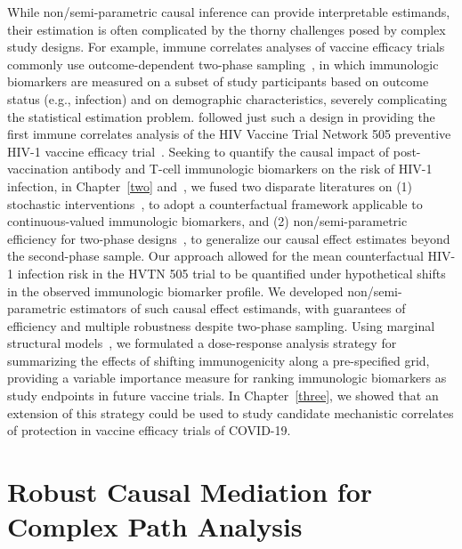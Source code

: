 While non/semi-parametric causal inference can provide interpretable estimands,
their estimation is often complicated by the thorny challenges posed by complex
study designs. For example, immune correlates analyses of vaccine efficacy
trials commonly use outcome-dependent two-phase
sampling~\citep{haynes2012immune}, in which immunologic biomarkers are measured
on a subset of study participants based on outcome status (e.g., infection) and
on demographic characteristics, severely complicating the statistical estimation
problem. \citet{janes2017higher} followed just such a design in providing the
first immune correlates analysis of the HIV Vaccine Trial Network 505 preventive
HIV-1 vaccine efficacy trial~\citep{hammer2013efficacy}. Seeking to quantify the
causal impact of post-vaccination antibody and T-cell immunologic biomarkers on
the risk of HIV-1 infection, in Chapter~\ref{two}
and~\citet{hejazi2020efficient}, we fused two disparate literatures on (1)
stochastic interventions~\citep{stock1989nonparametric,diaz2012population}, to
adopt a counterfactual framework applicable to continuous-valued immunologic
biomarkers, and (2) non/semi-parametric efficiency for two-phase
designs~\citep{breslow2003large,rose2011targeted2sd}, to generalize our causal
effect estimates beyond the second-phase sample. Our approach allowed for the
mean counterfactual HIV-1 infection risk in the HVTN 505 trial to be quantified
under hypothetical shifts in the observed immunologic biomarker profile. We
developed non/semi-parametric estimators of such causal effect estimands, with
guarantees of efficiency and multiple robustness despite two-phase sampling.
Using marginal structural models~\citep{neugebauer2007nonparametric}, we
formulated a dose-response analysis strategy for summarizing the effects of
shifting immunogenicity along a pre-specified grid, providing a variable
importance measure for ranking immunologic biomarkers as study endpoints in
future vaccine trials. In Chapter~\ref{three}, we showed that an extension of
this strategy could be used to study candidate mechanistic correlates of
protection in vaccine efficacy trials of COVID-19.

\section{Robust Causal Mediation for Complex Path Analysis}

